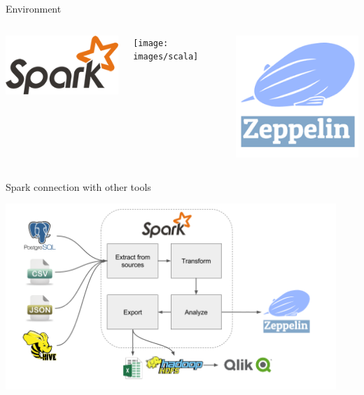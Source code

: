 \documentclass[unicode, notheorems]{beamer}
\begin{document}
\begin{frame}{Environment}
\begin{columns}
\begin{center}
	\includegraphics[scale=0.5]{images/spark}
\end{center}
\begin{center}
	\texttt{[image: images/scala]}
\end{center}
\begin{center}
	\includegraphics[scale=0.5]{images/zeppelin}
\end{center}
\end{columns}

\end{frame}


\begin{frame}{Spark connection with other tools}
\begin{center}
\includegraphics[width=12.5cm]{images/spark-overview}
\end{center}
\end{frame}
\end{document}

